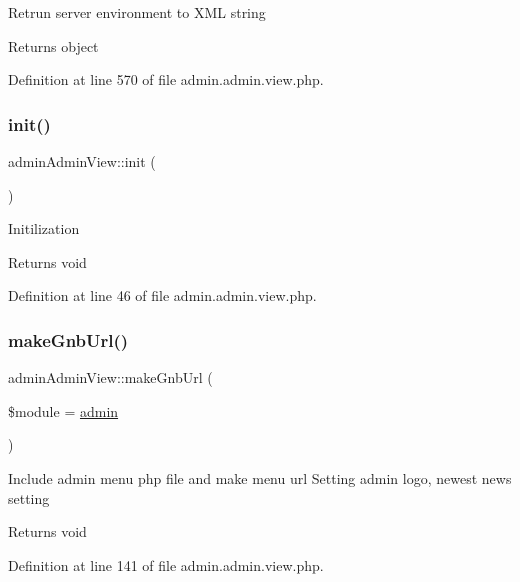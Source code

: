 Retrun server environment to X\+ML string \begin{DoxyReturn}{Returns}
object 
\end{DoxyReturn}


Definition at line 570 of file admin.\+admin.\+view.\+php.

\hypertarget{classadminAdminView_a9211d29a895ebead46f78e6fc9eab285}{}\label{classadminAdminView_a9211d29a895ebead46f78e6fc9eab285} 
\subsubsection{\texorpdfstring{init()}{init()}}
{\footnotesize\ttfamily admin\+Admin\+View\+::init (\begin{DoxyParamCaption}{ }\end{DoxyParamCaption})}

Initilization \begin{DoxyReturn}{Returns}
void 
\end{DoxyReturn}


Definition at line 46 of file admin.\+admin.\+view.\+php.

\hypertarget{classadminAdminView_a6f715be781a41d811166af0ae66b3b93}{}\label{classadminAdminView_a6f715be781a41d811166af0ae66b3b93} 
\subsubsection{\texorpdfstring{make\+Gnb\+Url()}{makeGnbUrl()}}
{\footnotesize\ttfamily admin\+Admin\+View\+::make\+Gnb\+Url (\begin{DoxyParamCaption}\item[{}]{\$module = {\ttfamily \textquotesingle{}\hyperlink{classadmin}{admin}\textquotesingle{}} }\end{DoxyParamCaption})}

Include admin menu php file and make menu url Setting admin logo, newest news setting \begin{DoxyReturn}{Returns}
void 
\end{DoxyReturn}


Definition at line 141 of file admin.\+admin.\+view.\+php.

\hypertarget{classadminAdminView_a4c4c900f637d618a7c8fbcbf523ad801}{}\label{classadminAdminView_a4c4c900f637d618a7c8fbcbf523ad801} 
